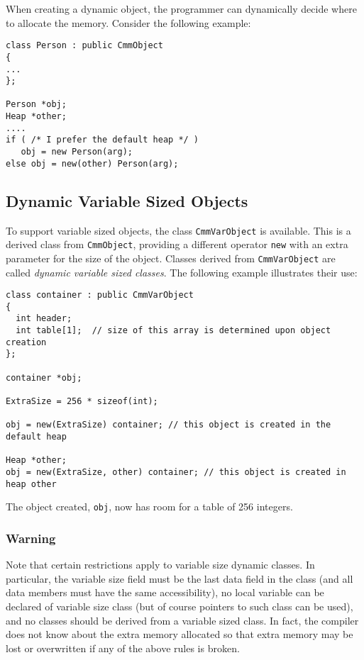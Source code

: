 When creating a dynamic object, the programmer can dynamically decide where to
allocate the memory.  Consider the following example:

\begin{verbatim}
class Person : public CmmObject
{
...
};

Person *obj;
Heap *other;
....
if ( /* I prefer the default heap */ )
   obj = new Person(arg);
else obj = new(other) Person(arg);
\end{verbatim}


\subsection{Dynamic Variable Sized Objects}

To support variable sized objects, the class {\tt CmmVarObject} is available.
This is a derived class from {\tt CmmObject}, providing a different operator
{\tt new} with an extra parameter for the size of the object.  Classes derived
from {\tt CmmVarObject} are called {\it dynamic variable sized classes\/}.
The following example illustrates their use:

\begin{verbatim}
class container : public CmmVarObject
{
  int header;
  int table[1];  // size of this array is determined upon object creation
};

container *obj;

ExtraSize = 256 * sizeof(int);

obj = new(ExtraSize) container; // this object is created in the default heap

Heap *other;
obj = new(ExtraSize, other) container; // this object is created in heap other
\end{verbatim}
The object created, {\tt obj}, now has room for a table of 256 integers.

\subsubsection*{Warning}

Note that certain restrictions apply to variable size dynamic classes.  In
particular, the variable size field must be the last data field in the class
(and all data members must have the same accessibility), no local variable can
be declared of variable size class (but of course pointers to such class can
be used), and no classes should be derived from a variable sized class.  In
fact, the compiler does not know about the extra memory allocated so that
extra memory may be lost or overwritten if any of the above rules is broken.


